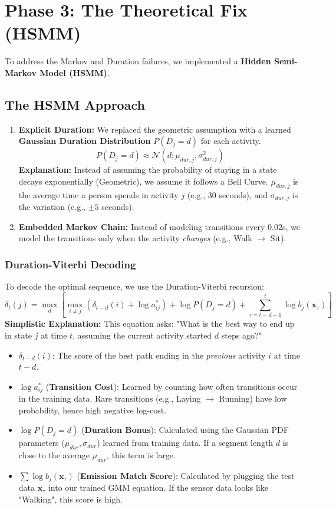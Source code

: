 \documentclass[11pt,a4paper]{article}
\newcommand{\bx}{\mathbf{x}}
\begin{document}
\section{Phase 3: The Theoretical Fix (HSMM)}

To address the Markov and Duration failures, we implemented a \textbf{Hidden Semi-Markov Model (HSMM)}.

\subsection{The HSMM Approach}
\begin{enumerate}
    \item \textbf{Explicit Duration:} We replaced the geometric assumption with a learned \textbf{Gaussian Duration Distribution} $P(D_j = d)$ for each activity.
    $$ P(D_j = d) \approx \mathcal{N}(d; \mu_{dur,j}, \sigma_{dur,j}^2) $$
    \textbf{Explanation:} Instead of assuming the probability of staying in a state decays exponentially (Geometric), we assume it follows a Bell Curve. $\mu_{dur,j}$ is the average time a person spends in activity $j$ (e.g., 30 seconds), and $\sigma_{dur,j}$ is the variation (e.g., $\pm 5$ seconds).

    \item \textbf{Embedded Markov Chain:} Instead of modeling transitions every 0.02s, we model the transitions only when the activity \textit{changes} (e.g., Walk $\to$ Sit).
\end{enumerate}

\subsubsection{Duration-Viterbi Decoding}
To decode the optimal sequence, we use the Duration-Viterbi recursion:
$$ \delta_t(j) = \max_{d} \left[ \max_{i \neq j} (\delta_{t-d}(i) + \log a_{ij}^*) + \log P(D_j=d) + \sum_{\tau=t-d+1}^t \log b_j(\bx_\tau) \right] $$
\textbf{Simplistic Explanation:}
This equation asks: "What is the best way to end up in state $j$ at time $t$, assuming the current activity started $d$ steps ago?"
\begin{itemize}
    \item $\delta_{t-d}(i)$: The score of the best path ending in the \textit{previous} activity $i$ at time $t-d$.
    \item $\log a_{ij}^*$ (\textbf{Transition Cost}): Learned by counting how often transitions occur in the training data. Rare transitions (e.g., Laying $\to$ Running) have low probability, hence high negative log-cost.
    \item $\log P(D_j=d)$ (\textbf{Duration Bonus}): Calculated using the Gaussian PDF parameters ($\mu_{dur}, \sigma_{dur}$) learned from training data. If a segment length $d$ is close to the average $\mu_{dur}$, this term is large.
    \item $\sum \log b_j(\bx_\tau)$ (\textbf{Emission Match Score}): Calculated by plugging the test data $\bx_\tau$ into our trained GMM equation. If the sensor data looks like "Walking", this score is high.
\end{itemize}
\end{document}
